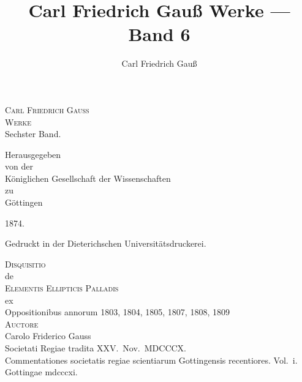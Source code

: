 \documentclass[12pt,a4paper]{article}
\title{Carl Friedrich Gau{\ss} Werke --- Band 6}
\author{Carl Friedrich Gau{\ss}}
\date{}
\begin{document}

\thispagestyle{empty}
\begin{center}
\vspace*{3cm}

{\Huge\scshape Carl Friedrich Gau{\ss}}\\[2em]
{\Huge\scshape Werke}\\[3em]
{\LARGE Sechster Band.}\\[3em]

\vspace{2cm}

{\large Herausgegeben\\[0.5em]
von der\\[0.5em]
K\"oniglichen Gesellschaft der Wissenschaften\\[0.5em]
zu\\[0.5em]
G\"ottingen}\\[3em]

\vspace{3cm}

{\large 1874.}
\end{center}

\newpage
\thispagestyle{empty}
\vspace*{\fill}
\begin{center}
{\small Gedruckt in der Dieterichschen Universit\"atsdruckerei.}
\end{center}
\vspace*{\fill}

\newpage


\newpage
\thispagestyle{empty}
\begin{center}
\vspace*{2cm}

{\Large\scshape Disquisitio}\\[1em]
{\large de}\\[1em]
{\Large\scshape Elementis Ellipticis Palladis}\\[1em]
{\large ex}\\[1em]
{\large Oppositionibus annorum 1803, 1804, 1805, 1807, 1808, 1809}\\[2em]

{\scshape Auctore}\\[0.5em]
{\Large Carolo Friderico Gauss}\\[1em]

{\small Societati Regiae tradita XXV.\ Nov.\ MDCCCX.}\\[1em]

{\small Commentationes societatis regiae scientiarum Gottingensis recentiores. Vol.~i.}\\
{\small Gottingae mdcccxi.}
\end{center}
\end{document}
